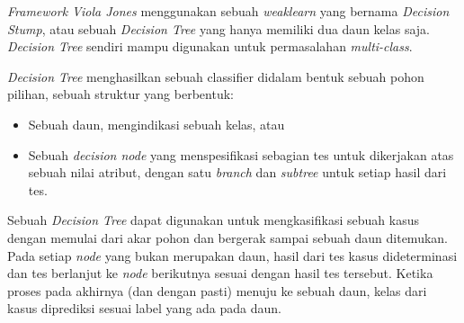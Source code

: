 \emph{Framework Viola Jones} menggunakan sebuah \emph{weaklearn} yang bernama 
\emph{Decision Stump}, atau sebuah \emph{Decision Tree} yang hanya memiliki 
dua daun kelas saja. \emph{Decision Tree} sendiri mampu digunakan untuk 
permasalahan \emph{multi-class}.

\emph{Decision Tree} menghasilkan sebuah classifier didalam bentuk sebuah pohon 
pilihan, sebuah struktur yang berbentuk:
\begin{itemize}
  \item Sebuah daun, mengindikasi sebuah kelas, atau
  \item Sebuah \emph{decision node} yang menspesifikasi 
  sebagian tes untuk dikerjakan atas sebuah nilai 
  atribut, dengan satu \emph{branch} dan \emph{subtree} untuk 
  setiap hasil dari tes.
\end{itemize}

Sebuah \emph{Decision Tree} dapat digunakan untuk mengkasifikasi sebuah kasus 
dengan memulai dari akar pohon dan bergerak sampai sebuah daun ditemukan. 
Pada setiap \emph{node} yang bukan merupakan daun, hasil dari tes kasus 
dideterminasi dan tes berlanjut ke \emph{node} berikutnya sesuai dengan 
hasil tes tersebut. Ketika proses pada akhirnya (dan dengan pasti) 
menuju ke sebuah daun, kelas dari kasus diprediksi sesuai label yang ada pada daun.



